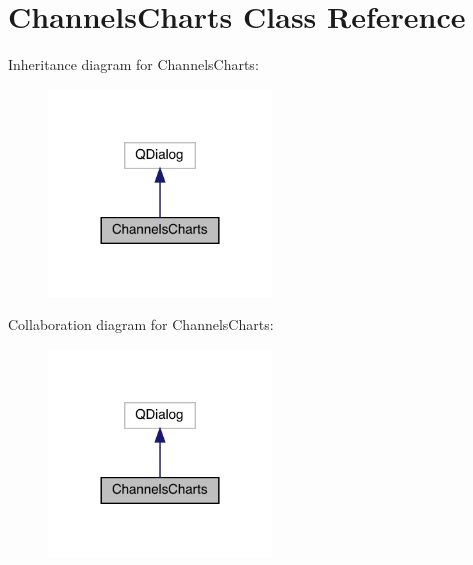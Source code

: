 \hypertarget{class_channels_charts}{}\section{Channels\+Charts Class Reference}
\label{class_channels_charts}


Inheritance diagram for Channels\+Charts\+:
\nopagebreak
\begin{figure}[H]
\begin{center}
\leavevmode
\includegraphics[width=168pt]{class_channels_charts__inherit__graph}
\end{center}
\end{figure}


Collaboration diagram for Channels\+Charts\+:
\nopagebreak
\begin{figure}[H]
\begin{center}
\leavevmode
\includegraphics[width=168pt]{class_channels_charts__coll__graph}
\end{center}
\end{figure}
